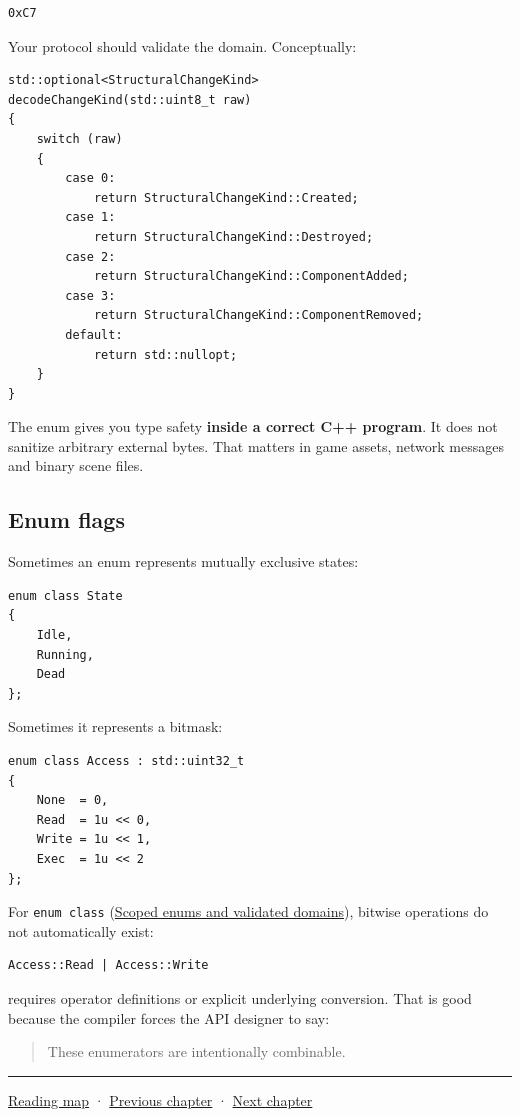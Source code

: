 \begin{verbatim}
0xC7
\end{verbatim}

Your protocol should validate the domain. Conceptually:

\begin{verbatim}
std::optional<StructuralChangeKind>
decodeChangeKind(std::uint8_t raw)
{
    switch (raw)
    {
        case 0:
            return StructuralChangeKind::Created;
        case 1:
            return StructuralChangeKind::Destroyed;
        case 2:
            return StructuralChangeKind::ComponentAdded;
        case 3:
            return StructuralChangeKind::ComponentRemoved;
        default:
            return std::nullopt;
    }
}
\end{verbatim}

The enum gives you type safety \textbf{inside a correct C++ program}. It does not sanitize arbitrary external bytes. That matters in game assets, network messages and binary scene files.

\subsection{Enum flags}\label{01-foundations-i-ch002-enum-flags}

Sometimes an enum represents mutually exclusive states:

\begin{verbatim}
enum class State
{
    Idle,
    Running,
    Dead
};
\end{verbatim}

Sometimes it represents a bitmask:

\begin{verbatim}
enum class Access : std::uint32_t
{
    None  = 0,
    Read  = 1u << 0,
    Write = 1u << 1,
    Exec  = 1u << 2
};
\end{verbatim}

For \texttt{enum\ class} (\hyperref[appendix-23640fcee147]{Scoped enums and validated domains}), bitwise operations do not automatically exist:

\begin{verbatim}
Access::Read | Access::Write
\end{verbatim}

requires operator definitions or explicit underlying conversion. That is good because the compiler forces the API designer to say:

\begin{quote}
These enumerators are intentionally combinable.
\end{quote}

\begin{center}\rule{0.5\linewidth}{0.5pt}\end{center}

\hyperref[volume-reading-map]{Reading map} · \hyperref[01-foundations-i-ch001-from-bits-to-running-systems]{Previous chapter} · \hyperref[01-foundations-i-ch003-records-as-resource-transactions]{Next chapter}
